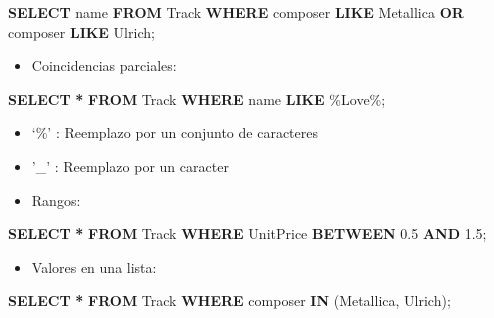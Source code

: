 \documentclass[
]{book}
\newenvironment{Shaded}{\begin{snugshade}}{\end{snugshade}}
\newcommand{\FloatTok}[1]{\textcolor[rgb]{0.00,0.00,0.81}{#1}}
\newcommand{\KeywordTok}[1]{\textcolor[rgb]{0.13,0.29,0.53}{\textbf{#1}}}
\newcommand{\NormalTok}[1]{#1}
\newcommand{\OperatorTok}[1]{\textcolor[rgb]{0.81,0.36,0.00}{\textbf{#1}}}
\newcommand{\StringTok}[1]{\textcolor[rgb]{0.31,0.60,0.02}{#1}}
\providecommand{\tightlist}{%
  \setlength{\itemsep}{0pt}\setlength{\parskip}{0pt}}
\theoremstyle{break}
\theoremstyle{nonumberplain}
\begin{document}
\begin{Shaded}
\begin{Highlighting}[]
  \KeywordTok{SELECT}\NormalTok{ name }\KeywordTok{FROM}\NormalTok{ Track}
  \KeywordTok{WHERE}\NormalTok{ composer }\KeywordTok{LIKE} \StringTok{\textquotesingle{}Metallica\textquotesingle{}} \KeywordTok{OR}\NormalTok{ composer }\KeywordTok{LIKE} \StringTok{\textquotesingle{}Ulrich\textquotesingle{}}\NormalTok{; }
\end{Highlighting}
\end{Shaded}

\begin{itemize}
\tightlist
\item
  Coincidencias parciales:
\end{itemize}

\begin{Shaded}
\begin{Highlighting}[]
  \KeywordTok{SELECT} \OperatorTok{*} \KeywordTok{FROM}\NormalTok{ Track}
  \KeywordTok{WHERE}\NormalTok{ name }\KeywordTok{LIKE} \StringTok{\textquotesingle{}\%Love\%\textquotesingle{}}\NormalTok{; }
\end{Highlighting}
\end{Shaded}

\begin{itemize}
\item
  `\%' : Reemplazo por un conjunto de caracteres
\item
  '\_' : Reemplazo por un caracter
\item
  Rangos:
\end{itemize}

\begin{Shaded}
\begin{Highlighting}[]
  \KeywordTok{SELECT} \OperatorTok{*} \KeywordTok{FROM}\NormalTok{ Track}
  \KeywordTok{WHERE}\NormalTok{ UnitPrice }\KeywordTok{BETWEEN} \FloatTok{0.5} \KeywordTok{AND} \FloatTok{1.5}\NormalTok{; }
\end{Highlighting}
\end{Shaded}

\begin{itemize}
\tightlist
\item
  Valores en una lista:
\end{itemize}

\begin{Shaded}
\begin{Highlighting}[]
  \KeywordTok{SELECT} \OperatorTok{*} \KeywordTok{FROM}\NormalTok{ Track}
  \KeywordTok{WHERE}\NormalTok{ composer }\KeywordTok{IN}\NormalTok{ (}\StringTok{\textquotesingle{}Metallica\textquotesingle{}}\NormalTok{, }\StringTok{\textquotesingle{}Ulrich\textquotesingle{}}\NormalTok{); }
\end{Highlighting}
\end{Shaded}
\end{document}
